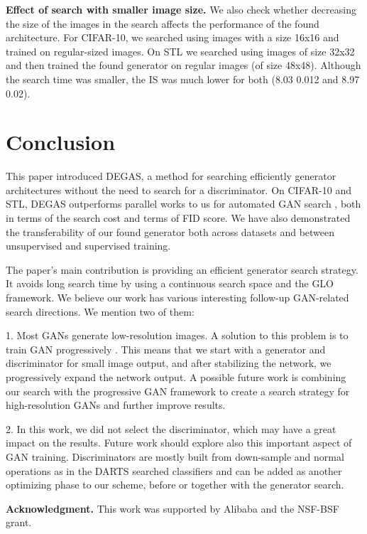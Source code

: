\documentclass[10pt,twocolumn,letterpaper]{article}
\newcommand{\ourmethod}{DEGAS}
\begin{document}
{\bf Effect of search with smaller image size.} We also check whether decreasing the size of the images in the search affects the performance of the found architecture. 
For CIFAR-10, we searched using images with a size 16x16 and trained on regular-sized images. On STL we searched using images of size 32x32 and then trained the found generator on regular images (of size 48x48). Although the search time was smaller, the IS was much lower for both (8.03  0.012 and 8.97  0.02).





   
\section{Conclusion}
\label{Discussion and conclusions}
This paper introduced \ourmethod{}, a method for searching efficiently generator architectures without the need to search for a discriminator.
On CIFAR-10 and STL, \ourmethod{} outperforms parallel works to us for automated GAN search \cite{agan},\cite{Autogan} both in terms of the search cost and terms of FID score.
We have also demonstrated the transferability of our found generator both across datasets and between unsupervised and supervised training. 

The paper's main contribution is providing an efficient generator search strategy.
It avoids long search time by using a  continuous search space and the GLO framework.
We believe our work has various interesting follow-up GAN-related search directions. We mention two of them: 

1. Most GANs generate low-resolution images. A solution to this problem is to train GAN progressively \cite{prog_gan}. This means that we start with a generator and discriminator for small image output, and after stabilizing the network, we progressively expand the network output.
A possible future work is combining our search with the progressive GAN framework to create a search strategy for high-resolution GANs and further improve results.


2. In this work, we did not select the discriminator, which may have a great impact on the results.
Future work should explore also this important aspect of GAN training. Discriminators are mostly built from down-sample and normal operations as in the DARTS searched classifiers and can be added as another optimizing phase to our scheme, before or together with the generator search.

{\bf Acknowledgment.} This work was supported by Alibaba and the NSF-BSF grant.

{\small


}
\end{document}
